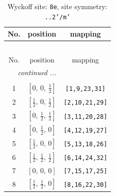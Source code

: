 \documentclass[fleqn,8pt]{jsarticle}
\begin{document}
\renewcommand{\arraystretch}{1.2}
\begin{longtable}{ccc}
\caption{Wyckoff site: {\tt 8e}, site symmetry: {\tt ..2'/m'}}
 \\
 \hline \hline
No. & position & mapping \\ \hline \endfirsthead

\multicolumn{2}{l}{\tablename\ \thetable{}} \\
 \hline \hline
No. & position & mapping \\ \hline \endhead

 \hline \hline
\multicolumn{2}{r}{\footnotesize\it continued ...} \\ \endfoot

 \hline \hline
\multicolumn{2}{r}{} \\ \endlastfoot

1 & $\left[ 0,\, 0,\, \frac{1}{2} \right]$ & {\tt [1,9,23,31]} \\ \hline
2 & $\left[ \frac{1}{2},\, 0,\, \frac{1}{2} \right]$ & {\tt [2,10,21,29]} \\ \hline
3 & $\left[ 0,\, \frac{1}{2},\, \frac{1}{2} \right]$ & {\tt [3,11,20,28]} \\ \hline
4 & $\left[ 0,\, \frac{1}{2},\, 0 \right]$ & {\tt [4,12,19,27]} \\ \hline
5 & $\left[ \frac{1}{2},\, 0,\, 0 \right]$ & {\tt [5,13,18,26]} \\ \hline
6 & $\left[ \frac{1}{2},\, \frac{1}{2},\, \frac{1}{2} \right]$ & {\tt [6,14,24,32]} \\ \hline
7 & $\left[ 0,\, 0,\, 0 \right]$ & {\tt [7,15,17,25]} \\ \hline
8 & $\left[ \frac{1}{2},\, \frac{1}{2},\, 0 \right]$ & {\tt [8,16,22,30]} \\
\end{longtable}
\renewcommand{\arraystretch}{1.2}
\end{document}
